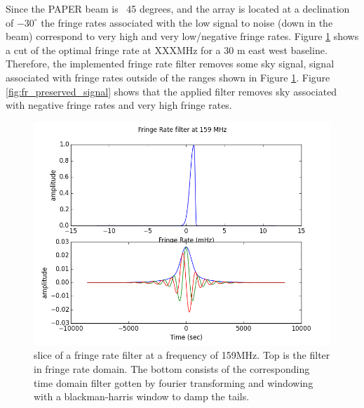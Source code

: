 \documentclass[twocolumn,numberedappendix]{emulateapj}
\begin{document}
Since the PAPER beam is ~45 degrees, and the array is located at a declination
of $-30^{\circ}$ the fringe rates associated with the low signal to noise (down
in the beam) correspond to very high and very low/negative fringe rates. Figure
\ref{fig:fringe_rate_cut} shows a cut of the optimal fringe rate at XXXMHz for a 30
m east west baseline. Therefore, the implemented fringe rate filter removes some
sky signal, signal associated with fringe rates outside of the ranges shown in
Figure \ref{fig:fringe_rate_cut}. Figure \ref{fig:fr_preserved_signal} shows
that the applied filter removes sky associated with negative fringe rates and
very high fringe rates. 

\begin{figure}
\centering
\includegraphics[width=\columnwidth]{plots/fr_filter_slice.png}
\caption{slice of a fringe rate filter at a frequency of 159MHz. Top is the
filter in fringe rate domain. The bottom consists of the corresponding time
domain filter gotten by fourier transforming and windowing with a
blackman-harris window to damp the tails.}
\label{fig:fringe_rate_cut}
\end{figure}
\end{document}
